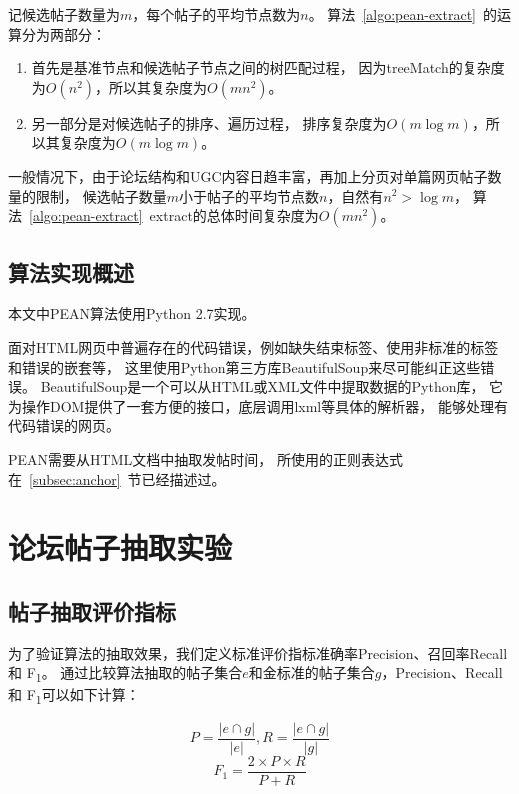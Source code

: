 记候选帖子数量为$m$，每个帖子的平均节点数为$n$。
算法~\ref{algo:pean-extract}~的运算分为两部分：
\begin{enumerate}
\item 首先是基准节点和候选帖子节点之间的树匹配过程，
因为treeMatch的复杂度为$O(n^2)$，所以其复杂度为$O(mn^2)$。
\item 另一部分是对候选帖子的排序、遍历过程，
排序复杂度为$O(m\log m)$，所以其复杂度为$O(m\log m)$。
\end{enumerate}

一般情况下，由于论坛结构和UGC内容日趋丰富，再加上分页对单篇网页帖子数量的限制，
候选帖子数量$m$小于帖子的平均节点数$n$，自然有$n^2 > \log m$，
算法~\ref{algo:pean-extract}~extract的总体时间复杂度为$O(mn^2)$。

\subsection{算法实现概述}
本文中PEAN算法使用Python 2.7实现。

面对HTML网页中普遍存在的代码错误，例如缺失结束标签、使用非标准的标签和错误的嵌套等，
这里使用Python第三方库BeautifulSoup来尽可能纠正这些错误。
BeautifulSoup是一个可以从HTML或XML文件中提取数据的Python库，
它为操作DOM提供了一套方便的接口，底层调用lxml等具体的解析器，
能够处理有代码错误的网页。

PEAN需要从HTML文档中抽取发帖时间，
所使用的正则表达式在~\ref{subsec:anchor}~节已经描述过。


\section{论坛帖子抽取实验}
\label{sec:pean-experiment}

\subsection{帖子抽取评价指标}
为了验证算法的抽取效果，我们定义标准评价指标准确率Precision、召回率Recall和
F\textsubscript{1}。
通过比较算法抽取的帖子集合$e$和金标准的帖子集合$g$，Precision、Recall和
F\textsubscript{1}可以如下计算：

\begin{equation}
P = \frac{\vert e \cap g \vert}{\vert e \vert}, 
R = \frac{\vert e \cap g \vert}{\vert g \vert}
\end{equation}
\begin{equation}
F_1 = \frac{2 \times P \times R}{P + R}
\end{equation}

